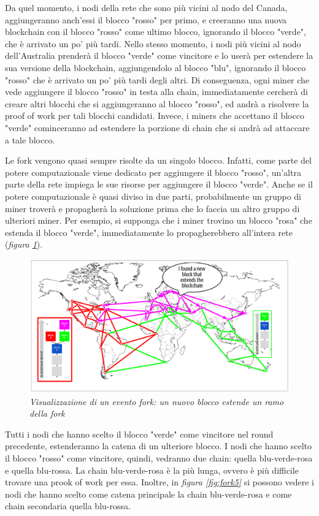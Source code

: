 Da quel momento, i nodi della rete che sono più vicini al nodo del Canada, aggiungeranno anch'essi il blocco "rosso" per primo, e creeranno una nuova blockchain con il blocco "rosso" come ultimo blocco, ignorando il blocco "verde", che è arrivato un po' più tardi. Nello stesso momento, i nodi più vicini al nodo dell'Australia prenderà il blocco "verde" come vincitore e lo userà per estendere la sua versione della blockchain, aggiungendolo al blocco "blu", ignorando il blocco "rosso" che è arrivato un po' più tardi degli altri. Di conseguenza, ogni miner che vede aggiungere il blocco "rosso" in testa alla chain, immediatamente cercherà di creare altri blocchi che si aggiungeranno al blocco "rosso", ed andrà a risolvere la proof of work per tali blocchi candidati. Invece, i miners che accettano il blocco "verde" cominceranno ad estendere la porzione di chain che si andrà ad attaccare a tale blocco.

Le fork vengono quasi sempre risolte da un singolo blocco. Infatti, come parte del potere computazionale viene dedicato per aggiungere il blocco "rosso", un'altra parte della rete impiega le sue risorse per aggiungere il blocco "verde". Anche se il potere computazionale è quasi diviso in due parti, probabilmente un gruppo di miner troverà e propagherà la soluzione prima che lo faccia un altro gruppo di ulteriori miner. Per esempio, si supponga che i miner trovino un blocco "rosa" che estenda il blocco "verde", immediatamente lo propagherebbero all'intera rete (\textit{figura \ref{fig:fork4}}).
\begin{figure}[htbp]
	\centering
	\includegraphics[width=0.85 \linewidth]{figure/fork4}
	\caption{\textit{Visualizzazione di un evento fork: un nuovo blocco estende un ramo della fork} \label{fig:fork4}}
\end{figure}

Tutti i nodi che hanno scelto il blocco "verde" come vincitore nel round precedente, estenderanno la catena di un ulteriore blocco. I nodi che hanno scelto il blocco "rosso" come vincitore, quindi, vedranno due chain: quella blu-verde-rosa e quella blu-rossa. La chain blu-verde-rosa è la più lunga, ovvero è più difficile trovare una prook of work per essa. Inoltre, in \textit{figura \ref{fig:fork5}} si possono vedere i nodi che hanno scelto come catena principale la chain blu-verde-rosa e come chain secondaria quella blu-rossa.

